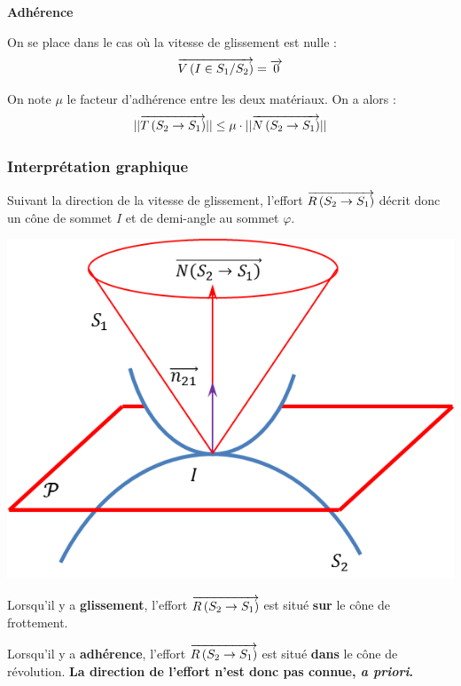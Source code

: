 \documentclass[10pt]{article}
\begin{document}
\begin{theo}
\textbf{Adhérence}

On se place dans le cas où la vitesse de glissement est nulle :
$$\overrightarrow{V\left( {I} \in {S_1}/{S_2}\right)} = \overrightarrow{0}$$

On note $\mu$ le facteur d'adhérence entre les deux matériaux. On a alors : 
$$
||\overrightarrow{T\left(S_2\rightarrow S_1\right)}|| \leq \mu\cdot ||\overrightarrow{N\left(S_2\rightarrow S_1\right)}||
$$
\end{theo}


\subsubsection{Interprétation graphique}
\begin{minipage}[c]{.6\linewidth}
Suivant la direction de la vitesse de glissement, l'effort $\overrightarrow{R\left( {S_2} \rightarrow {S_1}\right)}$ décrit donc un cône de sommet $I$ et de demi-angle au sommet $\varphi$.
\end{minipage}\hfill
\begin{minipage}[c]{.35\linewidth}
\begin{center}
\includegraphics[width=\textwidth]{images/cone}
\end{center}
\end{minipage}

Lorsqu'il y a \textbf{glissement}, l'effort $\overrightarrow{R\left( {S_2} \rightarrow {S_1}\right)}$ est situé \textbf{sur} le cône de frottement. 

Lorsqu'il y a \textbf{adhérence}, l'effort $\overrightarrow{R\left( {S_2} \rightarrow {S_1}\right)}$ est situé \textbf{dans} le cône de révolution.  \textbf{La direction de l'effort n'est donc pas connue, \textit{a priori}.}
\end{document}
